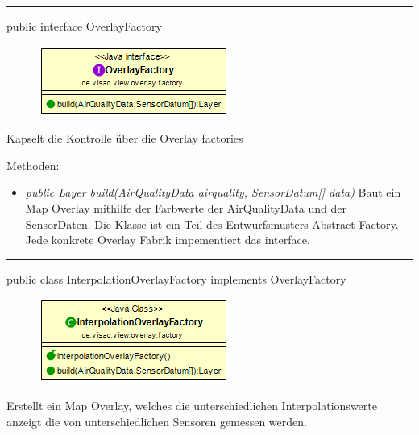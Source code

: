 
\rule{\textwidth}{0.4pt}
public interface OverlayFactory

\begin{minipage}{0.3\textwidth}
    \begin{figure}[H]
        \includegraphics[scale = 0.5
        ]{media/frontend/view/de.view.overlay.factory/OverlayFactory_Class.png}
    \end{figure}
    \end{minipage} \hfill
    \begin{minipage}{0.6\textwidth}
Kapselt die Kontrolle über die Overlay factories
\end{minipage}

Methoden:
\begin{itemize}
    \item \emph{public Layer build(AirQualityData airquality, SensorDatum[] data)}  Baut ein Map Overlay mithilfe der Farbwerte der AirQualityData und der SensorDaten. Die Klasse ist ein Teil des Entwurfsmusters Abstract-Factory. Jede konkrete Overlay Fabrik impementiert das interface.
\end{itemize}

\rule{\textwidth}{0.4pt}
public class InterpolationOverlayFactory implements OverlayFactory

\begin{minipage}{0.3\textwidth}
    \begin{figure}[H]
        \includegraphics[scale = 0.5]{media/frontend/view/de.view.overlay.factory/InterpolationOverlayFactory_Class.png}
    \end{figure}
    \end{minipage} \hfill
    \begin{minipage}{0.6\textwidth}
Erstellt ein Map Overlay, welches die unterschiedlichen Interpolationswerte anzeigt die von unterschiedlichen Sensoren gemessen werden.
\end{minipage}

